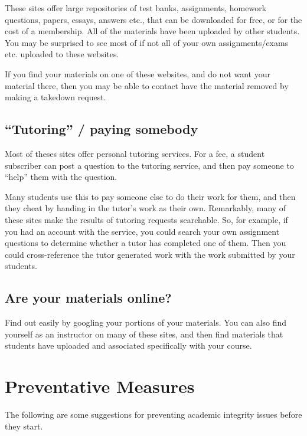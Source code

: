 \documentclass[]{book}
\theoremstyle{definition}
\theoremstyle{definition}
\theoremstyle{definition}
\theoremstyle{remark}
\begin{document}
These sites offer large repositories of test banks, assignments,
homework questions, papers, essays, answers etc., that can be downloaded
for free, or for the cost of a membership. All of the materials have
been uploaded by other students. You may be surprised to see most of if
not all of your own assignments/exams etc. uploaded to these websites.

If you find your materials on one of these websites, and do not want
your material there, then you may be able to contact have the material
removed by making a takedown request.

\section{\texorpdfstring{``Tutoring'' / paying
somebody}{Tutoring / paying somebody}}\label{tutoring-paying-somebody}

Most of theses sites offer personal tutoring services. For a fee, a
student subscriber can post a question to the tutoring service, and then
pay someone to ``help'' them with the question.

Many students use this to pay someone else to do their work for them,
and then they cheat by handing in the tutor's work as their own.
Remarkably, many of these sites make the results of tutoring requests
searchable. So, for example, if you had an account with the service, you
could search your own assignment questions to determine whether a tutor
has completed one of them. Then you could cross-reference the tutor
generated work with the work submitted by your students.

\section{Are your materials online?}\label{are-your-materials-online}

Find out easily by googling your portions of your materials. You can
also find yourself as an instructor on many of these sites, and then
find materials that students have uploaded and associated specifically
with your course.

\chapter{Preventative Measures}\label{preventative-measures}

The following are some suggestions for preventing academic integrity
issues before they start.
\end{document}
